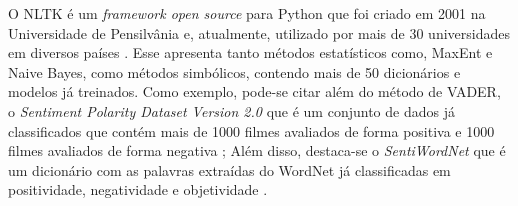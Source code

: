 O \ac{NLTK} é um \textit{framework open source} para Python que foi
criado em 2001 na Universidade de Pensilvânia e, atualmente, utilizado por mais
de 30 universidades em diversos
países \cite{nltk}.
Esse apresenta tanto métodos estatísticos como, \ac{MaxEnt} e Naive Bayes, como
métodos simbólicos, contendo mais de 50 dicionários e modelos já treinados.
Como exemplo, pode-se citar além do método de \ac{VADER}, o \textit{Sentiment
Polarity Dataset Version 2.0} que é um conjunto de dados já classificados que
contém mais de 1000 filmes avaliados de forma positiva e 1000 filmes avaliados
de forma negativa \cite{Pang:2002:TUS:1118693.1118704};
Além disso, destaca-se o \textit{SentiWordNet} que é um dicionário com as
palavras extraídas do WordNet já classificadas em positividade, negatividade e objetividade \cite{Esuli2006sentiwordnet}.
